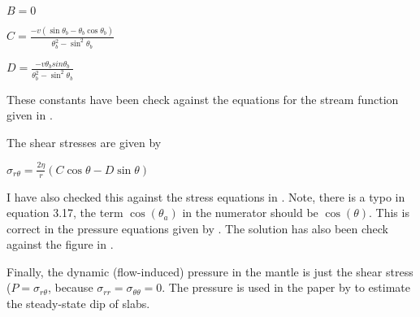\documentclass[11pt]{article}
\begin{document}
\(B = 0\)

\(C = \frac{-v (\sin\theta_b - \theta_b\cos\theta_b) }{\theta_b^2 - \sin^2\theta_b}\)

\(D = \frac{-v \theta_b sin\theta_b}{\theta_b^2 - \sin^2\theta_b}\)

These constants have been check against the equations for the stream
function given in \citet{mckenzie_gjras69}.

The shear stresses are given by

\(\sigma_{r\theta} = \frac{2\eta}{r}(C\cos\theta - D\sin\theta)\)

I have also checked this against the stress equations in \citet{mckenzie_gjras69}. 
Note, there is a typo in equation 3.17, the term
\(\cos(\theta_a)\) in the numerator should be \(\cos(\theta)\). This is
correct in the pressure equations given by \citet{stevenson_turner_nature77}. 
The solution has also been check against the figure in \citet{mckenzie_gjras69}.

Finally, the dynamic (flow-induced) pressure in the mantle is just the
shear stress (\(P=\sigma_{r\theta}\), because
\(\sigma_{rr} = \sigma_{\theta\theta} = 0\). The pressure is used in the
paper by \citet{stevenson_turner_nature77} to estimate the
steady-state dip of slabs.
\end{document}

